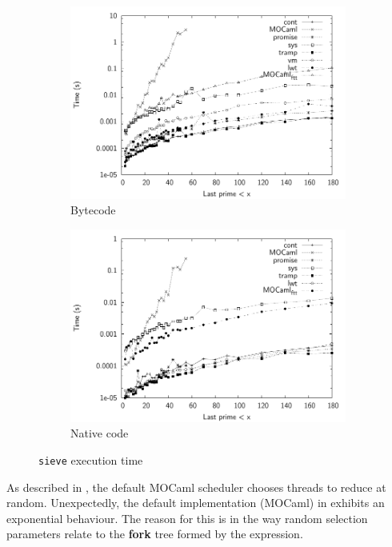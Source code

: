 \documentclass[12pt,twoside,notitlepage]{report}
\theoremstyle{plain}%
\theoremstyle{definition}
\theoremstyle{remark}
\begin{document}
\begin{figure}[H]
\centering
\begin{subfigure}[b]{0.6\linewidth}
\includegraphics[width=\linewidth]{./sieve_exec_times_bw}
\caption{Bytecode}
\label{fig:sieve_exec_times_bc}
\end{subfigure}
\begin{subfigure}[b]{0.6\linewidth}
\includegraphics[width=\linewidth]{./sieve_exec_times_opt_bw}
\caption{Native code}
\label{fig:sieve_exec_times_nat}
\end{subfigure}
\cprotect\caption{\verb|sieve| execution time}
\label{fig:sieve_exec_times}
\end{figure}


As described in , the default MOCaml scheduler chooses threads to reduce at random. Unexpectedly, the default implementation (MOCaml) in  exhibits an exponential behaviour. The reason for this is in the way random selection parameters relate to the \textbf{fork} tree formed by the expression.
\end{document}
